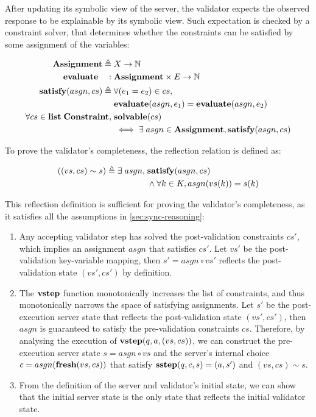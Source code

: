 \documentclass{article}
\theoremstyle{definition}
\newcommand{\Nat}{\mathbb N}
\newcommand{\sstep}{\ottkw{sstep}}
\newcommand{\vstep}{\ottkw{vstep}}
\newcommand{\List}{\ottkw{list}\;}
\newcommand{\Reflects}[2]{#1\sim #2}
\newcommand{\Constraint}{\ottkw{Constraint}}
\newcommand{\fresh}{\ottkw{fresh}}
\newcommand{\solvable}{\ottkw{solvable}}
\newcommand{\Assignment}{\ottkw{Assignment}}
\newcommand{\Evaluate}{\ottkw{evaluate}}
\newcommand{\Satisfy}{\ottkw{satisfy}}
\begin{document}
After updating its symbolic view of the server, the validator expects the
observed response to be explainable by its symbolic view.  Such expectation is
checked by a constraint solver, that determines whether the constraints can be
satisfied by some assignment of the variables:

\begin{align*}
  \Assignment\triangleq\;&X\to\Nat\\
  \Evaluate\quad:\;&\Assignment\times E\to\Nat\\
  \Satisfy(asgn,cs)\triangleq\;&\forall (e_1=e_2)\in cs,\\
  &\Evaluate(asgn,e_1)=\Evaluate(asgn,e_2)\\
  \forall cs\in\List{\Constraint},\;&\solvable(cs)\\
  &\iff\exists\; asgn\in\Assignment,\Satisfy(asgn,cs)
\end{align*}

To prove the validator's completeness, the reflection relation is defined as:

\begin{align*}
  (\Reflects{(vs,cs)}{s})\triangleq\exists\;asgn,\;&\Satisfy(asgn,cs)\\
  &\wedge \forall k\in K,asgn(vs(k))=s(k)
\end{align*}

This reflection definition is sufficient for proving the validator's
completeness, as it satisfies all the assumptions in \autoref{sec:sync-reasoning}:

\begin{enumerate}
\item Any accepting validator step has solved the post-validation constraints
  $cs'$, which implies an assignment $asgn$ that satisfies $cs'$.  Let $vs'$ be
  the post-validation key-variable mapping, then $s'=asgn\circ vs'$ reflects the
  post-validation state $(vs',cs')$ by definition.

\item The $\vstep$ function monotonically increases the list of constraints, and
  thus monotonically narrows the space of satisfying assignments.  Let $s'$ be
  the post-execution server state that reflects the post-validation state
  $(vs',cs')$, then $asgn$ is guaranteed to satisfy the pre-validation
  constraints $cs$.  Therefore, by analysing the execution of
  $\vstep(q,a,(vs,cs))$, we can construct the pre-execution server state
  $s=asgn\circ vs$ and the server's internal choice $c=asgn(\fresh(vs,cs))$ that
  satisfy $\sstep(q,c,s)=(a,s')$ and $\Reflects{(vs,cs)}{s}$.

\item From the definition of the server and validator's initial state, we can
  show that the initial server state is the only state that reflects the initial
  validator state.
\end{enumerate}
\end{document}
